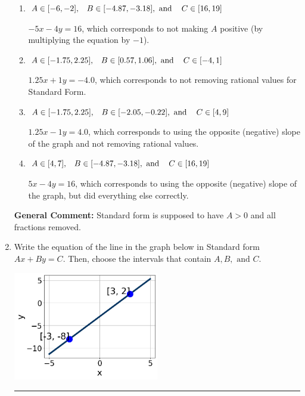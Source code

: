 \documentclass{extbook}[14pt]
\newcommand{\litem}[1]{\item #1

\rule{\textwidth}{0.4pt}}
\begin{document}
\begin{enumerate}
{\begin{enumerate}[label=\Alph*.]
* $5x + 4y = -16$, which is the correct option.
\item \( A \in [-6, -2], \hspace{3mm} B \in [-4.87, -3.18], \text{ and } \hspace{3mm} C \in [16, 19] \)

 $-5x - 4y = 16$, which corresponds to not making $A$ positive (by multiplying the equation by $-1$).
\item \( A \in [-1.75, 2.25], \hspace{3mm} B \in [0.57, 1.06], \text{ and } \hspace{3mm} C \in [-4, 1] \)

 $1.25x + 1y = -4.0$, which corresponds to not removing rational values for Standard Form.
\item \( A \in [-1.75, 2.25], \hspace{3mm} B \in [-2.05, -0.22], \text{ and } \hspace{3mm} C \in [4, 9] \)

 $1.25x - 1y = 4.0$, which corresponds to using the opposite (negative) slope of the graph and not removing rational values.
\item \( A \in [4, 7], \hspace{3mm} B \in [-4.87, -3.18], \text{ and } \hspace{3mm} C \in [16, 19] \)

 $5x - 4y = 16$, which corresponds to using the opposite (negative) slope of the graph, but did everything else correctly.
\end{enumerate}

\textbf{General Comment:} Standard form is supposed to have $A > 0$ and all fractions removed.
}
\litem{
Write the equation of the line in the graph below in Standard form $Ax+By=C$. Then, choose the intervals that contain $A, B, \text{ and } C$.

\begin{center}
    \includegraphics[width=0.5\textwidth]{../Figures/linearGraphToStandardC.png}
\end{center}


}
\end{enumerate}
\end{document}
